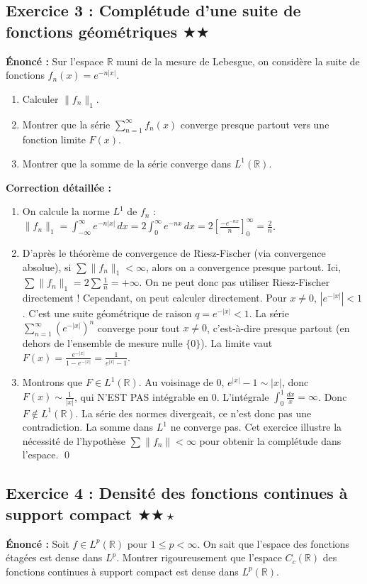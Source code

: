 \documentclass[11pt,a4paper]{article}
\begin{document}
\subsection*{Exercice 3 : Complétude d'une suite de fonctions géométriques \quad $\bigstar\bigstar$}
\textbf{Énoncé :}
Sur l'espace $\mathbb{R}$ muni de la mesure de Lebesgue, on considère la suite de fonctions $f_n(x) = e^{-n|x|}$.
\begin{enumerate}
\item Calculer $\|f_n\|_1$.
\item Montrer que la série $\sum_{n=1}^\infty f_n(x)$ converge presque partout vers une fonction limite $F(x)$.
\item Montrer que la somme de la série converge dans $L^1(\mathbb{R})$.
\end{enumerate}

\textbf{Correction détaillée :}
\begin{enumerate}
\item On calcule la norme $L^1$ de $f_n$ :
   $\|f_n\|_1 = \int_{-\infty}^{\infty} e^{-n|x|} \, dx = 2 \int_0^\infty e^{-nx} \, dx = 2 \left[ \frac{-e^{-nx}}{n} \right]_0^\infty = \frac{2}{n}$.
\item D'après le théorème de convergence de Riesz-Fischer (via convergence absolue), si $\sum \|f_n\|_1 < \infty$, alors on a convergence presque partout. Ici, $\sum \|f_n\|_1 = 2 \sum \frac{1}{n} = +\infty$. On ne peut donc pas utiliser Riesz-Fischer directement !
   Cependant, on peut calculer directement. Pour $x \neq 0$, $|e^{-|x|}| < 1$. C'est une suite géométrique de raison $q = e^{-|x|} < 1$.
   La série $\sum_{n=1}^\infty (e^{-|x|})^n$ converge pour tout $x \neq 0$, c'est-à-dire presque partout (en dehors de l'ensemble de mesure nulle $\{0\}$).
   La limite vaut $F(x) = \frac{e^{-|x|}}{1 - e^{-|x|}} = \frac{1}{e^{|x|} - 1}$.
\item Montrons que $F \in L^1(\mathbb{R})$.
   Au voisinage de $0$, $e^{|x|} - 1 \sim |x|$, donc $F(x) \sim \frac{1}{|x|}$, qui N'EST PAS intégrable en 0.
   L'intégrale $\int_0^1 \frac{dx}{x} = \infty$.
   Donc $F \notin L^1(\mathbb{R})$. La série des normes divergeait, ce n'est donc pas une contradiction. La somme dans $L^1$ ne converge pas. Cet exercice illustre la nécessité de l'hypothèse $\sum \|f_n\| < \infty$ pour obtenir la complétude dans l'espace. \qed
\end{enumerate}


\subsection*{Exercice 4 : Densité des fonctions continues à support compact \quad $\bigstar\bigstar\star$}
\textbf{Énoncé :}
Soit $f \in L^p(\mathbb{R})$ pour $1 \le p < \infty$. On sait que l'espace des fonctions étagées est dense dans $L^p$.
Montrer rigoureusement que l'espace $C_c(\mathbb{R})$ des fonctions continues à support compact est dense dans $L^p(\mathbb{R})$.
\end{document}
